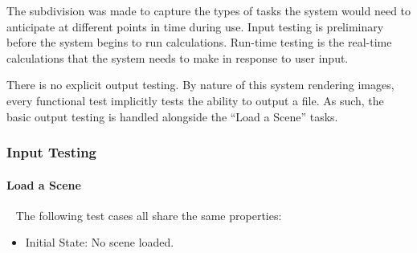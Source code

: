 \documentclass[12pt, titlepage]{article}
\begin{document}
The subdivision was made to capture the types of tasks the system would need to 
anticipate at different points in time during use. Input testing is preliminary 
before the system begins to run calculations. Run-time testing is the real-time 
calculations that the system needs to make in response to user input.

There is no explicit output testing. By nature of this system rendering images, 
every functional test implicitly tests the ability to output a file. As such, 
the basic output testing is handled alongside the ``Load a Scene'' tasks.

%

\subsubsection{Input Testing}

		
\paragraph{Load a Scene}
~\newline
The following test cases all share the same properties:

\begin{itemize}
	\item[] Initial State: No scene loaded.
\end{itemize}
\end{document}
